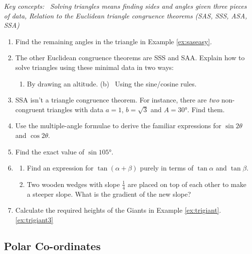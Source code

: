   
\begin{exercises}{}{}
	\hangindent\leftmargini
	\emph{Key concepts: \ Solving triangles means finding sides and angles given three pieces of data,  Relation to the Euclidean triangle congruence theorems (SAS, SSS, ASA, SSA)}

	\begin{enumerate}
		\item Find the remaining angles in the triangle in Example \ref{ex:saseasy}.%

	  \item The other Euclidean congruence theorems are SSS and SAA. Explain how to solve triangles using these minimal data in two ways:
	  \begin{enumerate}
	    \item By drawing an altitude. \qquad\qquad 
	    (b) \ Using the sine/cosine rules.
	  \end{enumerate}
	
	  \item SSA isn't a triangle congruence theorem. For instance, there are \emph{two} non-congruent triangles with data $a=1$, $b=\sqrt 3$ and $A=\ang{30}$. Find them.
	
	  \item Use the multiple-angle formulae to derive the familiar expressions for $\sin 2\theta$ and $\cos 2\theta$.
	  
	  \item Find the exact value of $\sin\ang{105}$.
	  
	  \item\begin{enumerate}
	    \item Find an expression for $\tan(\alpha+\beta)$ purely in terms of $\tan\alpha$ and $\tan\beta$.
	  	 \item Two wooden wedges with slope $\frac 14$ are placed on top of each other to make a steeper slope. What is the gradient of the new slope?
	  \end{enumerate} 
	  
	  \item Calculate the required heights of the Giants in Example \ref*{ex:trigiant}.\ref{ex:trigiant3}
	\end{enumerate}
\end{exercises}


\clearpage



\subsection{Polar Co-ordinates}

